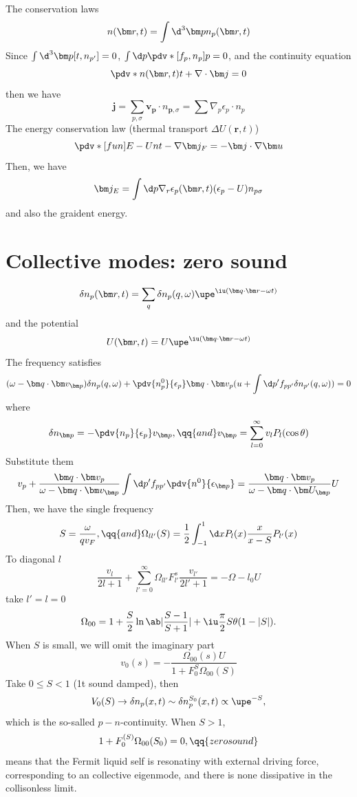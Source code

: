 The conservation laws
\[
  n(\bm r, t) = \int \d^3\bm p n_p(\bm r, t)
\]
Since $\int \d^3\bm p[t, n_{p'}] = 0$,
$\int \d p \pdv*{[f_p, n_p]}{p} = 0$,
and the continuity equation
\[
  \pdv*{n(\bm r, t)}t + \nabla \cdot \bm j = 0
\]
then we have
\begin{equation}
  \bm j = \sum_{p, \sigma} \bm v_{\bm p} \cdot n_{\bm p, \sigma}
= \sum \nabla_p \epsilon_p \cdot n_p
\end{equation}
The energy conservation law (thermal transport $\Delta U(\bm r, t)$)
\begin{equation}
  \pdv*[fun]{E - Un}t - \nabla \bm j_F = -\bm j \cdot \nabla \bm u
\end{equation}
Then, we have
\[
  \bm j_E = \int \d p \nabla_r \epsilon_p (\bm r, t) (\epsilon_p - U) n_{p\sigma}
\]
and also the graident energy.

\section{Collective modes: zero sound}

\[
  \delta n_p(\bm r, t) = \sum_q \delta n_p(q, \omega)
  \upe^{\iu(\bm q \cdot \bm r-\omega t)}
\]
and the potential
\[
  U(\bm r, t) = U\upe^{\iu(\bm q\cdot\bm r-\omega t)}
\]
The frequency satisfies
\begin{equation}
  (\omega - \bm q \cdot \bm v_{\bm p}) \delta n_p(q, \omega)
+ \pdv{n_p^0}{\epsilon_p} \bm q \cdot \bm v_p
  (u + \int \d p' f_{pp'} \delta n_{p'} (q, \omega)) = 0
\end{equation}
where
\[
  \delta n_{\bm p} = -\pdv{n_p}{\epsilon_p} v_{\bm p}, \qq{and}
  v_{\bm p} = \sum_{l=0}^\infty v_l P_l(\cos\theta)
\]
Substitute them
\[
  v_p + \frac{\bm q \cdot \bm v_p}{\omega - \bm q \cdot \bm v_{\bm p}}
  \int \d p' f_{pp'} \pdv{n^0}{\epsilon_{\bm p}}
= \frac{\bm q \cdot \bm v_p}{\omega - \bm q \cdot \bm U_{\bm p}}U
\]
Then, we have the single frequency
\[
  S = \frac{\omega}{qv_F}, \qq{and}
  \Omega_{ll'}(S) = \frac12 \int_{-1}^1 \d x P_l(x) \frac{x}{x - S} P_{l'}(x)
\]
To diagonal $l$
\[
  \frac{v_l}{2l + 1} + \sum_{l'=0}^\infty \Omega_{ll'} F_{l'}^s \frac{v_{l'}}{2l' + 1}
= -\Omega-{l_0}U
\]
take $l' = l = 0$
\[
  \Omega_{00} = 1 + \frac S2 \ln\ab|\frac{S - 1}{S + 1}|
+ \iu\frac\pi2 S\theta(1 - |S|).
\]
When $S$ is small, we will omit the imaginary part
\[
  v_0(s) = -\frac{\Omega_{00}(s)U}{1 + F_0^S\Omega_{00}(S)}
\]
Take $0 \leq S < 1$ (1t sound damped), then
\[
  V_0(S) \to \delta n_p(x, t) \sim \delta n_p^{S_0}(x,t) \propto \upe^{-S},
\]
which is the so-salled $p-n$-continuity.
When $S > 1$,
\[
  1 + F_0^{(S)} \Omega_{00}(S_0) = 0, \qq{zero sound}
\]
means that the Fermit liquid self is resonatiny with external driving force,
corresponding to an collective eigenmode,
and there is none dissipative in the collisonless limit.


